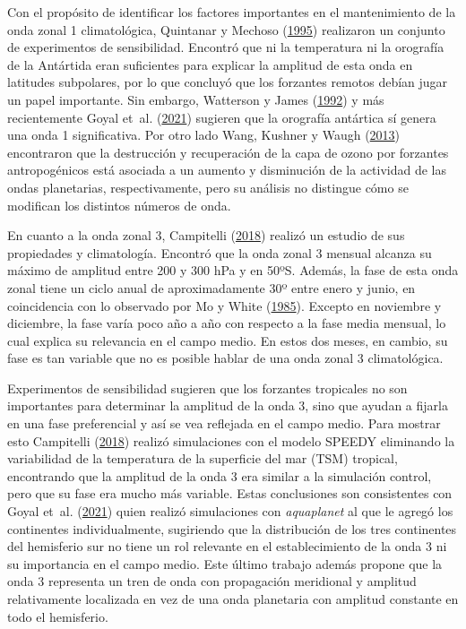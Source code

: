 \documentclass[12pt,oneside,a4paper]{reedthesis}
\begin{document}
Con el propósito de identificar los factores importantes en el mantenimiento de la onda zonal 1 climatológica, Quintanar y Mechoso (\protect\hyperlink{ref-quintanar1995a}{1995}) realizaron un conjunto de experimentos de sensibilidad.
Encontró que ni la temperatura ni la orografía de la Antártida eran suficientes para explicar la amplitud de esta onda en latitudes subpolares, por lo que concluyó que los forzantes remotos debían jugar un papel importante.
Sin embargo, Watterson y James (\protect\hyperlink{ref-watterson1992}{1992}) y más recientemente Goyal et~al. (\protect\hyperlink{ref-goyal2021a}{2021}) sugieren que la orografía antártica sí genera una onda 1 significativa.
Por otro lado Wang, Kushner y Waugh (\protect\hyperlink{ref-wang2013}{2013}) encontraron que la destrucción y recuperación de la capa de ozono por forzantes antropogénicos está asociada a un aumento y disminución de la actividad de las ondas planetarias, respectivamente, pero su análisis no distingue cómo se modifican los distintos números de onda.

En cuanto a la onda zonal 3, Campitelli (\protect\hyperlink{ref-campitelli2018b}{2018}) realizó un estudio de sus propiedades y climatología.
Encontró que la onda zonal 3 mensual alcanza su máximo de amplitud entre 200 y 300 hPa y en 50ºS.
Además, la fase de esta onda zonal tiene un ciclo anual de aproximadamente 30º entre enero y junio, en coincidencia con lo observado por Mo y White (\protect\hyperlink{ref-mo1985}{1985}).
Excepto en noviembre y diciembre, la fase varía poco año a año con respecto a la fase media mensual, lo cual explica su relevancia en el campo medio.
En estos dos meses, en cambio, su fase es tan variable que no es posible hablar de una onda zonal 3 climatológica.

Experimentos de sensibilidad sugieren que los forzantes tropicales no son importantes para determinar la amplitud de la onda 3, sino que ayudan a fijarla en una fase preferencial y así se vea reflejada en el campo medio.
Para mostrar esto Campitelli (\protect\hyperlink{ref-campitelli2018b}{2018}) realizó simulaciones con el modelo SPEEDY eliminando la variabilidad de la temperatura de la superficie del mar (TSM) tropical, encontrando que la amplitud de la onda 3 era similar a la simulación control, pero que su fase era mucho más variable.
Estas conclusiones son consistentes con Goyal et~al. (\protect\hyperlink{ref-goyal2021a}{2021}) quien realizó simulaciones con \emph{aquaplanet} al que le agregó los continentes individualmente, sugiriendo que la distribución de los tres continentes del hemisferio sur no tiene un rol relevante en el establecimiento de la onda 3 ni su importancia en el campo medio.
Este último trabajo además propone que la onda 3 representa un tren de onda con propagación meridional y amplitud relativamente localizada en vez de una onda planetaria con amplitud constante en todo el hemisferio.
\end{document}
